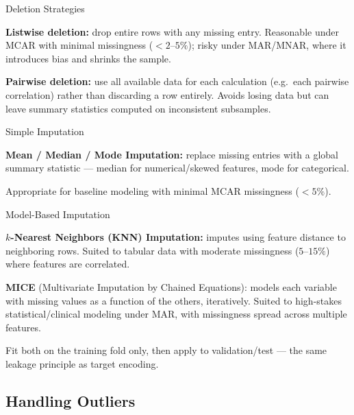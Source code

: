 \begin{frame}{Deletion Strategies}
    \begin{sitemize}
        \item \textbf{Listwise deletion:} drop entire rows with any missing entry. Reasonable under MCAR with minimal missingness ($<2$--$5\%$); risky under MAR/MNAR, where it introduces bias and shrinks the sample.
        \item \textbf{Pairwise deletion:} use all available data for each calculation (e.g.\ each pairwise correlation) rather than discarding a row entirely. Avoids losing data but can leave summary statistics computed on inconsistent subsamples.
    \end{sitemize}
\end{frame}


\begin{frame}{Simple Imputation}
    \begin{sitemize}
        \item \textbf{Mean / Median / Mode Imputation:} replace missing entries with a global summary statistic — median for numerical/skewed features, mode for categorical.
        \item Appropriate for baseline modeling with minimal MCAR missingness ($<5\%$).
    \end{sitemize}
\end{frame}


\begin{frame}{Model-Based Imputation}
    \begin{sitemize}
        \item \textbf{$k$-Nearest Neighbors (KNN) Imputation:} imputes using feature distance to neighboring rows. Suited to tabular data with moderate missingness ($5$--$15\%$) where features are correlated.
        \item \textbf{MICE} (Multivariate Imputation by Chained Equations): models each variable with missing values as a function of the others, iteratively. Suited to high-stakes statistical/clinical modeling under MAR, with missingness spread across multiple features.
        \item Fit both on the training fold only, then apply to validation/test — the same leakage principle as target encoding.
    \end{sitemize}
\end{frame}


\subsection{Handling Outliers}


